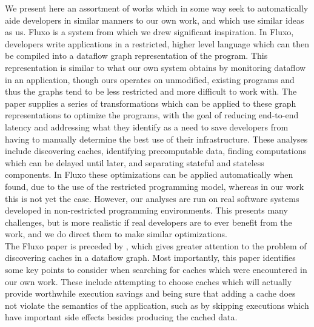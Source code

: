 \documentclass[msc,oneside]{ubcthesis}
\begin{document}
	We present here an assortment of works which in some way seek to automatically aide developers in similar manners to our own work, and which use similar ideas as us. Fluxo \cite{Kiciman2010} is a system from which we drew significant inspiration. In Fluxo, developers write applications in a restricted, higher level language which can then be compiled into a dataflow graph representation of the program. This representation is similar to what our own system obtains by monitoring dataflow in an application, though ours operates on unmodified, existing programs and thus the graphs tend to be less restricted and more difficult to work with. The paper supplies a series of transformations which can be applied to these graph representations to optimize the programs, with the goal of reducing end-to-end latency and addressing what they identify as a need to save developers from having to manually determine the best use of their infrastructure. These analyses include discovering caches, identifying precomputable data, finding computations which can be delayed until later, and separating stateful and stateless components. In Fluxo these optimizations can be applied automatically when found, due to the use of the restricted programming model, whereas in our work this is not yet the case. However, our analyses are run on real software systems developed in non-restricted programming environments. This presents many challenges, but is more realistic if real developers are to ever benefit from the work, and we do direct them to make similar optimizations.\\
	
	The Fluxo paper is preceded by \cite{Rasmussen2009}, which gives greater attention to the problem of discovering caches in a dataflow graph. Most importantly, this paper identifies some key points to consider when searching for caches which were encountered in our own work. These include attempting to choose caches which will actually provide worthwhile execution savings and being sure that adding a cache does not violate the semantics of the application, such as by skipping executions which have important side effects besides producing the cached data.\\
	
\end{document}
